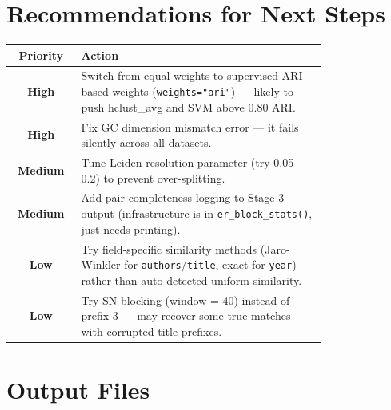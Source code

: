 \documentclass[11pt, a4paper]{article}
\begin{document}
\section{Recommendations for Next Steps}

\begin{table}[h!]
\centering
\begin{tabular}{cp{0.78\linewidth}}
\toprule
\textbf{Priority} & \textbf{Action} \\
\midrule
{\color{highprio}\textbf{High}}   & Switch from equal weights to supervised ARI-based weights (\texttt{weights="ari"}) --- likely to push hclust\_avg and SVM above 0.80 ARI. \\[4pt]
{\color{highprio}\textbf{High}}   & Fix GC dimension mismatch error --- it fails silently across all datasets. \\[4pt]
{\color{medprio}\textbf{Medium}}  & Tune Leiden resolution parameter (try 0.05--0.2) to prevent over-splitting. \\[4pt]
{\color{medprio}\textbf{Medium}}  & Add pair completeness logging to Stage 3 output (infrastructure is in \texttt{er\_block\_stats()}, just needs printing). \\[4pt]
{\color{lowprio}\textbf{Low}}     & Try field-specific similarity methods (Jaro-Winkler for \texttt{authors}/\texttt{title}, exact for \texttt{year}) rather than auto-detected uniform similarity. \\[4pt]
{\color{lowprio}\textbf{Low}}     & Try SN blocking (window = 40) instead of prefix-3 --- may recover some true matches with corrupted title prefixes. \\
\bottomrule
\end{tabular}
\end{table}

\section{Output Files}
\end{document}
